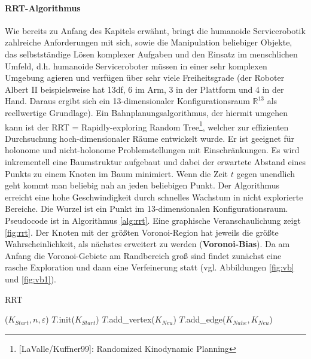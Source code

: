 \paragraph*{RRT-Algorithmus}
Wie bereits zu Anfang des Kapitels erwähnt, bringt die humanoide Servicerobotik zahlreiche Anforderungen mit sich, sowie die Manipulation beliebiger Objekte, das selbstständige Lösen komplexer Aufgaben und den Einsatz im menschlichen Umfeld, d.h. humanoide Serviceroboter müssen in einer sehr komplexen Umgebung agieren und verfügen über sehr viele Freiheitsgrade (der Roboter Albert II beispielsweise hat 13df,  6 im Arm, 3 in der Plattform und 4 in der Hand. Daraus ergibt sich ein 13-dimensionaler Konfigurationsraum $\mathbb{R}^{13}$ als reellwertige Grundlage).
Ein Bahnplanungsalgorithmus, der hiermit umgehen kann ist der RRT = Rapidly-exploring Random Tree\footnote{[LaValle/Kuffner99]: Randomized Kinodynamic
Planning}, welcher zur effizienten Durchsuchung hoch-dimensionaler Räume entwickelt wurde. Er ist geeignet für holonome und nicht-holonome Problemstellungen mit Einschränkungen. Es wird inkrementell eine Baumstruktur aufgebaut und dabei der erwartete Abstand eines Punkts zu einem Knoten im Baum minimiert. Wenn die Zeit $t$ gegen unendlich geht kommt man beliebig nah an jeden beliebigen Punkt. Der Algorithmus erreicht eine hohe Geschwindigkeit durch schnelles Wachstum in nicht explorierte Bereiche. Die Wurzel ist ein Punkt im 13-dimensionalen Konfigurationsraum. Pseudocode ist in Algorithmus \ref{alg:rrt}. 
Eine graphische Veranschaulichung zeigt \autoref{fig:rrt}.
Der Knoten mit der größten Voronoi-Region hat jeweils die größte Wahrscheinlichkeit, als nächstes erweitert zu werden (\textbf{Voronoi-Bias}). Da am Anfang die Voronoi-Gebiete am
Randbereich groß sind findet zunächst eine rasche Exploration und dann eine Verfeinerung statt (vgl. Abbildungen \ref{fig:vb} und \ref{fig:vb1}).
\begin{algorithm}
  \caption{RRT
    \label{alg:rrt}}
  \begin{algorithmic}[1]
    ($K_{Start}, n, \varepsilon$)
      \State $T$.init($K_{Start}$) 
         
         
         
        \State $T$.add\_vertex($K_{Neu}$)
        \State $T$.add\_edge($K_{Nahe}, K_{Neu}$)
      \EndFor
      \State {}
  \end{algorithmic}
\end{algorithm}

